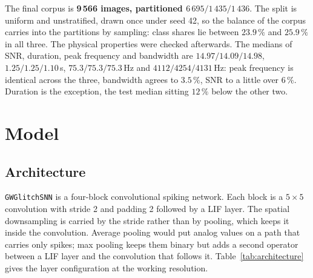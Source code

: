 The final corpus is \textbf{9\,566 images, partitioned $6\,695 / 1\,435 /
1\,436$}. The split is uniform and unstratified, drawn once under seed 42, so
the balance of the corpus carries into the partitions by sampling: class
shares lie between $23.9\,\%$ and $25.9\,\%$ in all three.
The physical properties were checked afterwards. The medians of SNR, duration,
peak frequency and bandwidth are $14.97 / 14.09 / 14.98$,
$1.25 / 1.25 / 1.10$\,s, $75.3 / 75.3 / 75.3$\,Hz and $4112 / 4254 / 4131$\,Hz:
peak frequency is identical across the three, bandwidth agrees to $3.5\,\%$, SNR
to a little over $6\,\%$. Duration is the exception, the test median sitting
$12\,\%$ below the other two.
\section{Model}
 
\subsection{Architecture}
 
\texttt{GWGlitchSNN} is a four-block convolutional spiking network. Each block is
a $5 \times 5$ convolution with stride 2 and padding 2 followed by a LIF layer. The
spatial downsampling is carried by the stride rather than by pooling, which
keeps it inside the convolution. Average pooling would put analog values on
a path that carries only spikes; max pooling keeps them binary but
adds a second operator between a LIF layer and the convolution that follows it.
Table~\ref{tab:architecture} gives the layer configuration at the working
resolution.
 
\begin{table}[htbp]
\caption{Layer configuration at the working resolution of 112\,px. The flattened
width is derived from the input size at construction ($25\,088$ at 224\,px,
$6\,272$ at 112\,px, $2\,048$ at 64\,px).}
\label{tab:architecture}
\end{table}
 
